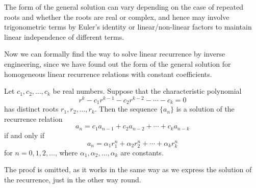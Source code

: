 \documentclass[12pt,a4paper]{article}
\begin{document}
The form of the general solution can vary depending on the case of repeated roots and whether the roots are real or complex, and hence may involve trigonometric terms by Euler's identity or linear/non-linear factors to maintain linear independence of different terms. 

Now we can formally find the way to solve linear recurrence by inverse engineering, since we have found out the form of the general solution for homogeneous linear recurrence relations with constant coefficients.

\begin{theorem}\label{w11:solution}
Let \( c_1, c_2, \dots, c_k \) be real numbers. Suppose that the characteristic polynomial
\[
r^k - c_1 r^{k-1} - c_2 r^{k-2} - \cdots - c_k = 0
\]
has distinct roots \( r_1, r_2, \dots, r_k \). Then the sequence \( \{a_n\} \) is a solution of the recurrence relation
\[
a_n = c_1 a_{n-1} + c_2 a_{n-2} + \cdots + c_k a_{n-k}
\]
if and only if
\[
a_n = \alpha_1 r_1^n + \alpha_2 r_2^n + \cdots + \alpha_k r_k^n
\]
for \( n = 0, 1, 2, \ldots \), where \( \alpha_1, \alpha_2, \dots, \alpha_k \) are constants.
\end{theorem}
The proof is omitted, as it works in the same way as we express the solution of the recurrence, just in the other way round.
\end{document}
